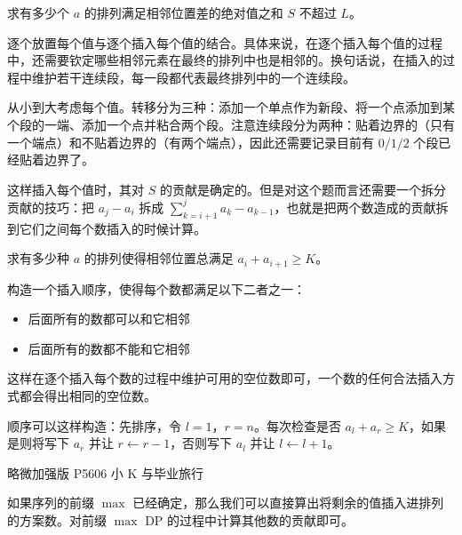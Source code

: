 \begin{example}
    求有多少个 $a$ 的排列满足相邻位置差的绝对值之和 $S$ 不超过 $L$。
\end{example}
\begin{solution}
    逐个放置每个值与逐个插入每个值的结合。具体来说，在逐个插入每个值的过程中，还需要钦定哪些相邻元素在最终的排列中也是相邻的。换句话说，在插入的过程中维护若干连续段，每一段都代表最终排列中的一个连续段。
    
    从小到大考虑每个值。转移分为三种：添加一个单点作为新段、将一个点添加到某个段的一端、添加一个点并粘合两个段。注意连续段分为两种：贴着边界的（只有一个端点）和不贴着边界的（有两个端点），因此还需要记录目前有 $0/1/2$ 个段已经贴着边界了。

    这样插入每个值时，其对 $S$ 的贡献是确定的。但是对这个题而言还需要一个拆分贡献的技巧：把 $a_j-a_i$ 拆成 $\sum_{k=i+1}^j a_k-a_{k-1}$，也就是把两个数造成的贡献拆到它们之间每个数插入的时候计算。
\end{solution}

\begin{example}[{[ARC148E] ≥ K}]
    求有多少种 $a$ 的排列使得相邻位置总满足 $a_i+a_{i+1}\ge K$。
\end{example}
\begin{solution}
    构造一个插入顺序，使得每个数都满足以下二者之一：
    \begin{itemize}
        \item 后面所有的数都可以和它相邻
        \item 后面所有的数都不能和它相邻
    \end{itemize}
    这样在逐个插入每个数的过程中维护可用的空位数即可，一个数的任何合法插入方式都会得出相同的空位数。

    顺序可以这样构造：先排序，令 $l=1$，$r=n$。每次检查是否 $a_l+a_r\ge K$，如果是则将写下 $a_r$ 并让 $r\gets r-1$，否则写下 $a_l$ 并让 $l\gets l+1$。 
\end{solution}
\begin{remark}
    略微加强版 P5606 小 K 与毕业旅行
\end{remark}

\begin{example}
    
\end{example}
\begin{solution}
    如果序列的前缀 $\max$ 已经确定，那么我们可以直接算出将剩余的值插入进排列的方案数。对前缀 $\max$ DP 的过程中计算其他数的贡献即可。
\end{solution}

